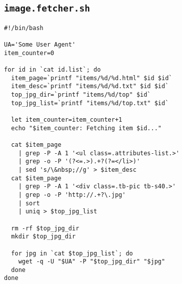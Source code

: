 \subsection{\tt image.fetcher.sh}\label{appsec:image-fetcher}
\begin{lstlisting}[frame=single]
#!/bin/bash

UA='Some User Agent'
item_counter=0

for id in `cat id.list`; do
  item_page=`printf "items/%d/%d.html" $id $id`
  item_desc=`printf "items/%d/%d.txt" $id $id`
  top_jpg_dir=`printf "items/%d/top" $id`
  top_jpg_list=`printf "items/%d/top.txt" $id`

  let item_counter=item_counter+1
  echo "$item_counter: Fetching item $id..."

  cat $item_page
    | grep -P -A 1 '<ul class=.attributes-list.>'
    | grep -o -P '(?<=.>).+?(?=</li>)'
    | sed 's/\&nbsp;//g' > $item_desc
  cat $item_page
    | grep -P -A 1 '<div class=.tb-pic tb-s40.>'
    | grep -o -P 'http://.+?\.jpg'
    | sort
    | uniq > $top_jpg_list

  rm -rf $top_jpg_dir
  mkdir $top_jpg_dir

  for jpg in `cat $top_jpg_list`; do
    wget -q -U "$UA" -P "$top_jpg_dir" "$jpg"
  done
done
\end{lstlisting}

